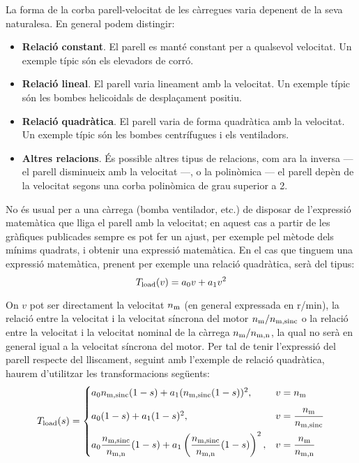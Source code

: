 La forma de la corba parell-velocitat de les càrregues varia depenent de la seva naturalesa. En general podem distingir:
\begin{itemize}
	\item  \textbf{Relació constant}. El parell es manté constant per a qualsevol velocitat. Un exemple típic són els elevadors de corró.
	
	\item  \textbf{Relació lineal}. El parell varia lineament amb la velocitat. Un exemple típic són les bombes helicoidals de desplaçament positiu.
	
	\item  \textbf{Relació quadràtica}. El parell varia de forma  quadràtica  amb la velocitat. Un exemple típic són les bombes centrífugues i els ventiladors.
	
	\item  \textbf{Altres relacions}. És possible altres tipus de relacions, com ara la inversa --- el parell disminueix amb la velocitat ---, o la polinòmica --- el parell depèn de la velocitat segons una corba polinòmica de grau superior a 2.
\end{itemize}

No és  usual per a una càrrega (bomba ventilador, etc.) de disposar de l'expressió matemàtica que lliga el parell amb la velocitat; en aquest cas a partir de les gràfiques publicades sempre es pot fer un ajust, per exemple pel mètode dels mínims quadrats, i obtenir una expressió matemàtica. En el cas que tinguem una expressió matemàtica, prenent per exemple una relació quadràtica, serà del tipus:
\begin{equation}
	T_\mathrm{load}(v) = a_0 v + a_1 v^2
\end{equation}

On $v$ pot ser directament la velocitat $n_\mathrm{m}$ (en general expressada en r/min),  la relació entre la velocitat i la velocitat síncrona del motor $n_\mathrm{m}/n_\mathrm{m,sinc}$ o la relació entre la velocitat i la velocitat nominal de la càrrega $n_\mathrm{m}/n_\mathrm{m,n}$, la qual no serà en general igual a la velocitat síncrona del motor. Per tal de tenir l'expressió del parell respecte del lliscament,  seguint amb l'exemple de relació quadràtica, haurem d'utilitzar les transformacions següents:
\begin{equation}\label{eq:Tload-v-s}
	T_\mathrm{load}(s) = \begin{cases}
		 a_0 n_\mathrm{m,sinc}(1-s) + a_1 (n_\mathrm{m,sinc}(1-s))^2,  & v=n_\mathrm{m}  \\[2ex]
		a_0 (1-s) + a_1 (1-s)^2, &   
		v =\dfrac{n_\mathrm{m}}{n_\mathrm{m,sinc}} \\[2ex]
		 a_0 \dfrac{n_\mathrm{m,sinc}}{n_\mathrm{m,n}}(1-s) + a_1 \left(\dfrac{n_\mathrm{m,sinc}}{n_\mathrm{m,n}}(1-s)\right)^2, &    v = \dfrac{n_\mathrm{m}}{n_\mathrm{m,n}}
	\end{cases}
\end{equation}


